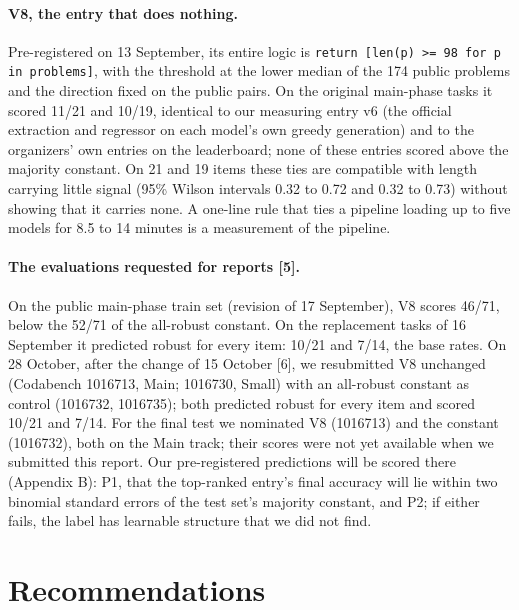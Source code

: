 \documentclass{article}
\begin{document}
\paragraph{V8, the entry that does nothing.}
Pre-registered on 13 September, its entire logic is \texttt{return [len(p) >= 98 for p in problems]}, with the threshold at the lower median of the 174 public problems and the direction fixed on the public pairs. On the original main-phase tasks it scored 11/21 and 10/19, identical to our measuring entry v6 (the official extraction and regressor on each model's own greedy generation) and to the organizers' own entries on the leaderboard; none of these entries scored above the majority constant. On 21 and 19 items these ties are compatible with length carrying little signal (95\% Wilson intervals 0.32 to 0.72 and 0.32 to 0.73) without showing that it carries none. A one-line rule that ties a pipeline loading up to five models for 8.5 to 14 minutes is a measurement of the pipeline.

\paragraph{The evaluations requested for reports [5].}
On the public main-phase train set (revision of 17 September), V8 scores 46/71, below the 52/71 of the all-robust constant. On the replacement tasks of 16 September it predicted robust for every item: 10/21 and 7/14, the base rates. On 28 October, after the change of 15 October [6], we resubmitted V8 unchanged (Codabench 1016713, Main; 1016730, Small) with an all-robust constant as control (1016732, 1016735); both predicted robust for every item and scored 10/21 and 7/14. For the final test we nominated V8 (1016713) and the constant (1016732), both on the Main track; their scores were not yet available when we submitted this report. Our pre-registered predictions will be scored there (Appendix B): P1, that the top-ranked entry's final accuracy will lie within two binomial standard errors of the test set's majority constant, and P2; if either fails, the label has learnable structure that we did not find.

\section{Recommendations}\label{sec:7}
\end{document}

